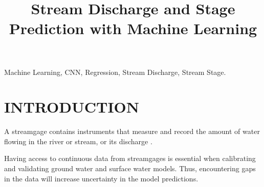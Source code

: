 \documentclass[conference]{IEEEtran}
\begin{document}
\title{Stream Discharge and Stage Prediction with Machine Learning}

\author{
}

\maketitle

\begin{IEEEkeywords}
Machine Learning, CNN, Regression, Stream Discharge, Stream Stage.
\end{IEEEkeywords}


\section{INTRODUCTION}

A streamgage contains instruments that measure and record the amount of water flowing in the river or stream, or its discharge \cite{streamgage}.

Having access to continuous data from streamgages is essential when calibrating and validating ground water and surface water models. Thus, encountering gaps in the data will increase uncertainty in the model predictions.
\end{document}

